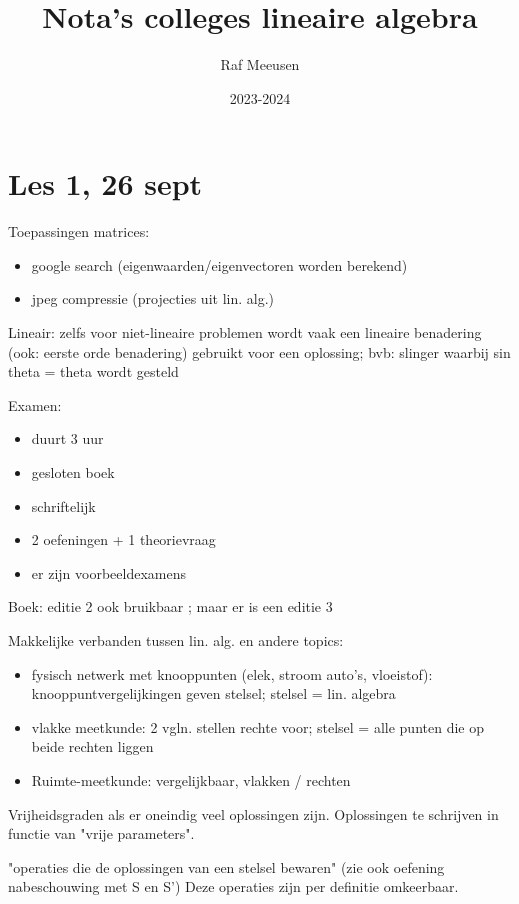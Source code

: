 \documentclass{article}
\title{Nota's colleges lineaire algebra}
\author{Raf Meeusen}
\date{2023-2024}
\begin{document}
\maketitle

\section*{Les 1, 26 sept}

Toepassingen matrices: 
\begin{itemize}
\item google search (eigenwaarden/eigenvectoren worden berekend) 
\item jpeg compressie (projecties uit lin. alg.) 
\end{itemize}


Lineair: zelfs voor niet-lineaire problemen wordt vaak een lineaire benadering (ook: eerste orde benadering) gebruikt voor een oplossing; bvb: slinger waarbij sin theta = theta wordt gesteld

Examen: 
\begin{itemize}
\item duurt 3 uur
\item gesloten boek
\item schriftelijk
\item 2 oefeningen + 1 theorievraag
\item er zijn voorbeeldexamens 
\end{itemize}

Boek: editie 2 ook bruikbaar ; maar er is een editie 3 


Makkelijke verbanden tussen lin. alg. en andere topics: 
\begin{itemize}
    \item fysisch netwerk met knooppunten (elek, stroom auto's, vloeistof): knooppuntvergelijkingen geven stelsel; stelsel = lin. algebra
    \item vlakke meetkunde: 2 vgln. stellen rechte voor; stelsel = alle punten die op beide rechten liggen
    \item Ruimte-meetkunde: vergelijkbaar, vlakken / rechten
\end{itemize}

Vrijheidsgraden als er oneindig veel oplossingen zijn. Oplossingen te schrijven in functie van "vrije parameters". 

"operaties die de oplossingen van een stelsel bewaren" 
(zie ook oefening nabeschouwing met S en S') 
Deze operaties zijn per definitie omkeerbaar.  
\end{document}

